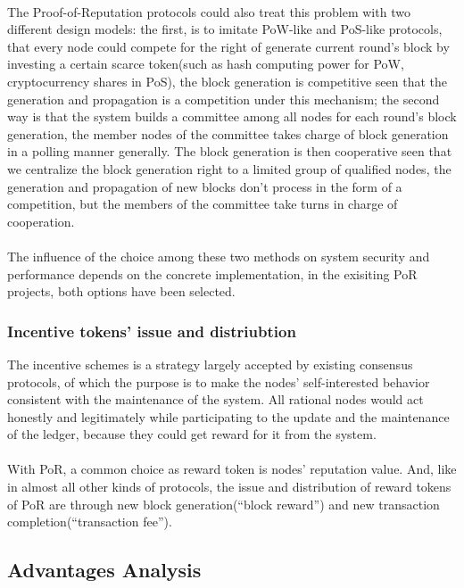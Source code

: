 \documentclass[]{article}
\begin{document}
\begin{CJK*}{UTF8}{gbsn}
\paragraph{} The Proof-of-Reputation protocols could also treat this problem with two different design models: the first, is to imitate PoW-like and PoS-like protocols, that every node could compete for the right of generate current round's block by investing a certain scarce token(such as hash computing power for PoW, cryptocurrency shares in PoS), the block generation is competitive seen that the generation and propagation is a competition under this mechanism; the second way is that the system builds a committee among all nodes for each round's block generation, the member nodes of the committee takes charge of block generation in a polling manner generally. The block generation is then cooperative seen that we centralize the block generation right to a limited group of qualified nodes, the generation and propagation of new blocks don't process in the form of a competition, but the members of the committee take turns in charge of cooperation.\paragraph{} The influence of the choice among these two methods on system security and performance depends on the concrete implementation, in the exisiting PoR projects, both options have been selected.
\subsubsection*{Incentive tokens' issue and distriubtion}
The incentive schemes is a strategy largely accepted by existing consensus protocols, of which the purpose is to make the nodes' self-interested behavior consistent with the maintenance of the system. All rational nodes would act honestly and legitimately while participating to the update and the maintenance of the ledger, because they could get reward for it from the system.
\paragraph{} With PoR, a common choice as reward token is nodes' reputation value. And, like in almost all other kinds of protocols, the issue and distribution of reward tokens of PoR are through new block generation(``block reward'') and new transaction completion(``transaction fee'').

\subsection{Advantages Analysis}

\end{CJK*}
\end{document}
